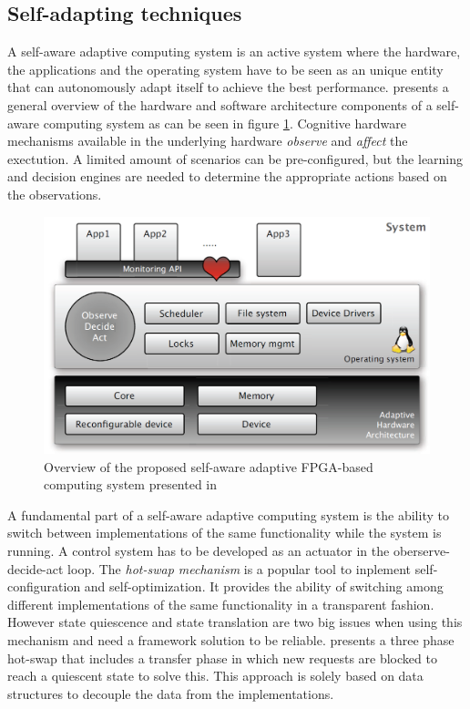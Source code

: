 \subsection{Self-adapting techniques}
\label{sec:selfadapting}

A self-aware adaptive computing system is an active system where the hardware, the applications and the operating system have to be seen as an unique entity that can autonomously adapt itself to achieve the best performance. \cite{selfaware} presents a general overview of the hardware and software architecture components of a self-aware computing system as can be seen in figure \ref{fig:selfaware}. Cognitive hardware mechanisms available in the underlying hardware \emph{observe} and \emph{affect} the exectution. A limited amount of scenarios can be pre-configured, but the learning and decision engines are needed to determine the appropriate actions based on the observations. 

\begin{figure}[htb]%
\includegraphics[width=\columnwidth]{Pictures/self-aware.PNG}%
\caption{Overview of the proposed self-aware adaptive FPGA-based computing system presented in \cite{selfaware}}%
\label{fig:selfaware}%
\end{figure}

A fundamental part of a self-aware adaptive computing system is the ability to switch between implementations of the same functionality while the system is running. A control system has to be developed as an actuator in the oberserve-decide-act loop. The \emph{hot-swap mechanism} is a popular tool to inplement self-configuration and self-optimization. It provides the ability of switching among different implementations of the same functionality in a transparent fashion. However state quiescence and state translation are two big issues when using this mechanism and need a framework solution to be reliable. \cite{self-aware} presents a three phase hot-swap that includes a transfer phase in which new requests are blocked to reach a quiescent state to solve this. This approach is solely based on data structures to decouple the data from the implementations.


